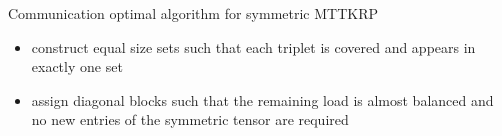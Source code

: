 \documentclass[final]{beamer}
\newlength{\colwidth}
\begin{document}
\begin{frame}[t]
\begin{columns}[t]
\begin{column}{\colwidth}
\begin{block}{Communication optimal algorithm for symmetric MTTKRP}
\begin{itemize}
	\item construct equal size sets such that each triplet is covered and appears in exactly one set
	\item assign diagonal blocks such that the remaining load is almost balanced and no new entries of the symmetric tensor are required
\end{itemize}

\vspace*{-0.35cm}

\end{block}
\end{column}
\end{columns}
\end{frame}
\end{document}
